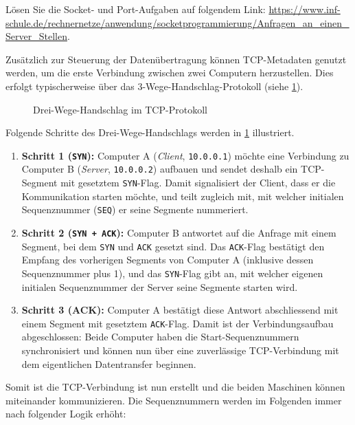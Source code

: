 \begin{mychallenge}
	Lösen Sie die Socket- und Port-Aufgaben auf folgendem Link: \url{https://www.inf-schule.de/rechnernetze/anwendung/socketprogrammierung/Anfragen_an_einen_Server_Stellen}.
\end{mychallenge}

Zusätzlich zur Steuerung der Datenübertragung können \gls{TCP}-Metadaten genutzt werden, um die erste Verbindung zwischen zwei Computern herzustellen. Dies erfolgt typischerweise über das 3-Wege-Handschlag-Protokoll (siehe \cref{fig:threewayHandshake}).

\begin{figure}[H]
	\centering
	
	\caption{Drei-Wege-Handschlag im \gls{TCP}-Protokoll}
	\label{fig:threewayHandshake}
\end{figure}
Folgende Schritte des Drei-Wege-Handschlags werden in \cref{fig:threewayHandshake} illustriert.
\begin{enumerate}
	\item \textbf{Schritt 1 (\texttt{SYN}):} Computer A (\textit{Client}, \texttt{10.0.0.1}) möchte eine Verbindung zu Computer B (\textit{Server}, \texttt{10.0.0.2}) aufbauen und sendet deshalb ein \gls{TCP}-Segment mit gesetztem \texttt{SYN}-Flag. Damit signalisiert der Client, dass er die Kommunikation starten möchte, und teilt zugleich mit, mit welcher initialen Sequenznummer (\texttt{SEQ}) er seine Segmente nummeriert.
	\item \textbf{Schritt 2 (\texttt{SYN + ACK}):} Computer B antwortet auf die Anfrage mit einem Segment, bei dem \texttt{SYN} und \texttt{ACK} gesetzt sind. Das \texttt{ACK}-Flag bestätigt den Empfang des vorherigen Segments von Computer A (inklusive dessen Sequenznummer plus 1), und das \texttt{SYN}-Flag gibt an, mit welcher eigenen initialen Sequenznummer der Server seine Segmente starten wird.
	\item \textbf{Schritt 3 (\texttt{}ACK):} Computer A bestätigt diese Antwort abschliessend mit einem Segment mit gesetztem \texttt{ACK}-Flag. Damit ist der Verbindungsaufbau abgeschlossen: Beide Computer haben die Start-Sequenznummern synchronisiert und können nun über eine zuverlässige \gls{TCP}-Verbindung mit dem eigentlichen Datentransfer beginnen.
\end{enumerate}
Somit ist die \gls{TCP}-Verbindung ist nun erstellt und die beiden Maschinen können miteinander kommunizieren. Die Sequenznummern werden im Folgenden immer nach folgender Logik erhöht:


